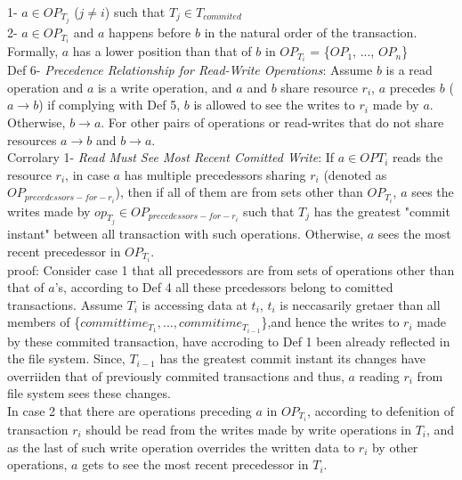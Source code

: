 \documentclass[a4paper, 11pt]{article}
\begin{document}
\hspace{7mm} 1- $a \in OP_{T_j}$ ($j \neq i$)  such that $T_j \in T_{commited}$ \\

\hspace{7mm} 2- $a \in OP_{T_i}$ and $a$ happens before $b$ in the natural order of the transaction. Formally, $a$ has a lower position than that of $b$ in $OP_{T_i}$ = \{$OP_1$, ..., $OP_n$\} \\


Def 6- \emph{Precedence Relationship for Read-Write Operations}: Assume $b$ is a read operation and $a$ is a write operation, and $a$ and $b$ share resource $r_i$, $a$ precedes $b$ ($a \rightarrow b$) if complying with Def 5, $b$ is allowed to see the writes to $r_i$ made by $a$. Otherwise, $b \rightarrow a$. For other pairs of operations or read-writes that do not share resources $a \rightarrow b$ and $b \rightarrow a$.\\


Corrolary 1- \emph{Read Must See Most Recent Comitted Write}: If $a \in OP{T_i}$ reads the resource $r_i$, in case $a$ has multiple precedessors sharing $r_i$ (denoted as $OP_{precedessors-for-r_i}$), then if all of them are from sets other than $OP_{T_i}$, $a$ sees the writes made by $op_{T_j} \in OP_{precedessors-for-r_i}$ such that $T_j$ has the greatest "commit instant" between all transaction with such operations. Otherwise, $a$ sees the most recent precedessor in $OP_{T_i}$. \\

proof: Consider case 1 that all precedessors are from sets of operations other than that of $a$'s, according to Def 4 all these prcedessors belong to comitted transactions. Assume $T_i$ is accessing data at $t_i$, $t_i$ is neccasarily gretaer than all members of \{$committime_{T_1}, ..., commitime_{T_{i-1}}$\},and hence the writes to $r_i$ made by these commited transaction, have accroding to Def 1 been already reflected in the file system. Since, $T_{i-1}$ has the greatest commit instant its changes have overriiden that of previously commited transactions and thus, $a$ reading $r_i$ from file system sees these changes.\\

In case 2 that there are operations preceding $a$ in $OP_{T_i}$, according to defenition of transaction $r_i$ should be read from the writes made by write operations in $T_i$, and as the last of such write operation overrides the written data to $r_i$ by other operations, $a$ gets to see the most recent precedessor in $T_i$.\\   
\end{document}
